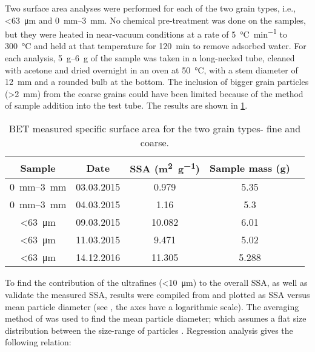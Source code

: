 Two surface area analyses were performed for each of the two grain types, i.e., \SI{<63}{\micro\meter} and \SIrange[range-units = single,range-phrase = --]{0}{3}{\milli\metre}. No chemical pre-treatment was done on the samples, but they were heated in near-vacuum conditions at a rate of \SI{5}{\degreeCelsius\per\minute} to \SI{300}{\degreeCelsius} and held at that temperature for \SI{120}{\minute} to remove adsorbed water. For each analysis, \SIrange[range-units = single,range-phrase = --]{5}{6}{\gram} of the sample was taken in a long-necked tube, cleaned with acetone and dried overnight in an oven at \SI{50}{\degreeCelsius}, with a stem diameter of \SI{12}{\milli\meter} and a rounded bulb at the bottom. The inclusion of bigger grain particles (\SI{>2}{mm}) from the coarse grains could have been limited because of the method of sample addition into the test tube. The results are shown in \cref{tab:BET_a_table}. 

\begin{table}[h]
  \centering
      \begin{tabular}{ccccc}
    \toprule
    \textbf{Sample} & \textbf{Date} &  \textbf{SSA (\si{\square\metre\per\gram})} & \textbf{Sample mass (\si{\gram})} \\
    \midrule
    \SIrange[range-units = single,range-phrase = --]{0}{3}{\milli\metre} & 03.03.2015      & 0.979 & 5.35 \\
    \SIrange[range-units = single,range-phrase = --]{0}{3}{\milli\metre} & 04.03.2015     & 1.16  & 5.3 \\
    
    \SI{<63}{\micro\metre} & 09.03.2015      & 10.082 & 6.01 \\
    \SI{<63}{\micro\metre}  & 11.03.2015      & 9.471 & 5.02 \\
    \SI{<63}{\micro\metre}  & 14.12.2016      & 11.305 & 5.288\\
    \bottomrule
    \end{tabular}%
    \caption{BET measured specific surface area for the two grain types- fine and coarse.}
  \label{tab:BET_a_table}
\end{table}%

To find the contribution of the ultrafines (\SI{<10}{\micro\meter}) to the overall SSA, as well as validate the measured SSA, results were compiled from\;\cite{brantley2000,rimstidt2012,moosdorf2014} and plotted as SSA versus mean particle diameter (see , the axes have a logarithmic scale). The averaging method of \cite{tester1994} was used to find the mean particle diameter; which assumes a flat size distribution between the size-range of particles \citep{rimstidt2013}. Regression analysis gives the following relation:

